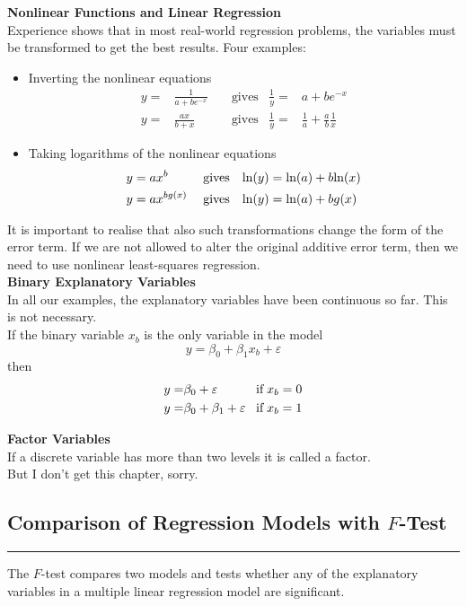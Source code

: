 \textbf{Nonlinear Functions and Linear Regression}\\
Experience shows that in most real-world regression problems, the variables must be transformed to get the best results. Four examples:
\begin{itemize}
  \item Inverting the nonlinear equations
  \begin{align*}
    y =& \frac{1}{a+be^{-x}}  &  \;&\text{gives} & \frac{1}{y} =& a + be^{-x}\\
    y =& \frac{ax}{b+x}       &  \;&\text{gives} & \frac{1}{y} =& \frac{1}{a} + \frac{a}{b} \frac{1}{x}
  \end{align*}
  \item Taking logarithms of the nonlinear equations
  \begin{align*}
    y &= ax^b       & \;&\text{gives} & \textup{ln}(y) &= \textup{ln}(a) + b\textup{ln}(x)\\
    y &= ax^{bg(x)} & \;&\text{gives} & \textup{ln}(y) &= \textup{ln}(a) + bg(x)
  \end{align*}
\end{itemize}
It is important to realise that also such transformations change the form of the error term. If we are not allowed to alter the original additive error term, then we need to use nonlinear least-squares regression.\\

\textbf{Binary Explanatory Variables}\\
In all our examples, the explanatory variables have been continuous so far. This is not necessary.\\
If the binary variable $x_b$ is the only variable in the model
\begin{equation}
  y = \beta_0 + \beta_1 x_b + \varepsilon
\end{equation}
then
\begin{equation}
  \begin{split}
    y =& \beta_0 + \varepsilon\\
    y =& \beta_0 + \beta_1 + \varepsilon
  \end{split}
  \;\;\;
  \begin{split}
    \textup{if}\; x_b = 0\\
    \textup{if}\; x_b = 1
  \end{split}
\end{equation}

\textbf{Factor Variables}\\
If a discrete variable has more than two levels it is called a factor.\\
But I don't get this chapter, sorry.

\subsection{Comparison of Regression Models with $F$-Test}
\noindent\rule[\linienAbstand]{\linewidth}{\linienDicke}
The $F$-test compares two models and tests whether any of the explanatory variables in a multiple linear regression model are significant.
